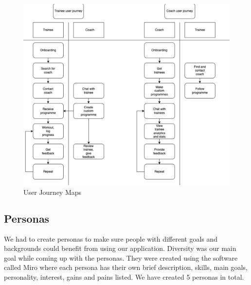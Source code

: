\begin{figure}[H]
    \centering
    \includegraphics[width=1\textwidth]{Resources/UserJourneyMaps.png}
    \caption{User Journey Maps}
    \label{fig:UserJourneyMaps}
  \end{figure}


\subsection{Personas}
We had to create personas to make sure people with different goals and backgrounds could benefit from using our application. Diversity was our main goal while coming up with the personas. They were created using the software called Miro where each persona has their own brief description, skills, main goals, personality, interest, gains and pains listed. We have created 5 personas in total. 

